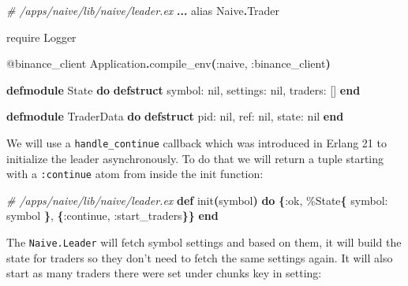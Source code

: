 \documentclass[
  oneside]{book}
\newenvironment{Shaded}{\begin{snugshade}}{\end{snugshade}}
\newcommand{\CommentTok}[1]{\textcolor[rgb]{0.56,0.35,0.01}{\textit{#1}}}
\newcommand{\ConstantTok}[1]{\textcolor[rgb]{0.56,0.35,0.01}{#1}}
\newcommand{\FunctionTok}[1]{\textcolor[rgb]{0.13,0.29,0.53}{\textbf{#1}}}
\newcommand{\ImportTok}[1]{#1}
\newcommand{\KeywordTok}[1]{\textcolor[rgb]{0.13,0.29,0.53}{\textbf{#1}}}
\newcommand{\NormalTok}[1]{#1}
\newcommand{\OperatorTok}[1]{\textcolor[rgb]{0.81,0.36,0.00}{\textbf{#1}}}
\newcommand{\OtherTok}[1]{\textcolor[rgb]{0.56,0.35,0.01}{#1}}
\newcommand{\VariableTok}[1]{\textcolor[rgb]{0.00,0.00,0.00}{#1}}
\begin{document}
\begin{Shaded}
\begin{Highlighting}[]
\CommentTok{\# /apps/naive/lib/naive/leader.ex}
  \OperatorTok{...}
  \ImportTok{alias} \ConstantTok{Naive}\OperatorTok{.}\ConstantTok{Trader}

  \ImportTok{require} \ConstantTok{Logger}

  \OtherTok{@binance\_client} \ConstantTok{Application}\OperatorTok{.}\NormalTok{compile\_env}\FunctionTok{(}\VariableTok{:naive}\NormalTok{, }\VariableTok{:binance\_client}\FunctionTok{)}

  \KeywordTok{defmodule} \ConstantTok{State} \KeywordTok{do}
    \KeywordTok{defstruct} \VariableTok{symbol:} \ConstantTok{nil}\NormalTok{,}
              \VariableTok{settings:} \ConstantTok{nil}\NormalTok{,}
              \VariableTok{traders:} \OtherTok{[]}
  \KeywordTok{end}

  \KeywordTok{defmodule} \ConstantTok{TraderData} \KeywordTok{do}
    \KeywordTok{defstruct} \VariableTok{pid:} \ConstantTok{nil}\NormalTok{,}
              \VariableTok{ref:} \ConstantTok{nil}\NormalTok{,}
              \VariableTok{state:} \ConstantTok{nil}
  \KeywordTok{end}
\end{Highlighting}
\end{Shaded}

We will use a \texttt{handle\_continue} callback which was introduced in Erlang 21 to
initialize the leader asynchronously. To do that we will return a tuple starting with a \texttt{:continue} atom from inside the init function:

\begin{Shaded}
\begin{Highlighting}[]
  \CommentTok{\# /apps/naive/lib/naive/leader.ex}
  \KeywordTok{def}\NormalTok{ init}\FunctionTok{(}\NormalTok{symbol}\FunctionTok{)} \KeywordTok{do}
    \FunctionTok{\{}\VariableTok{:ok}\NormalTok{,}
\NormalTok{      \%}\ConstantTok{State}\FunctionTok{\{}
          \VariableTok{symbol:}\NormalTok{ symbol}
      \FunctionTok{\}}\NormalTok{, }\FunctionTok{\{}\VariableTok{:continue}\NormalTok{, }\VariableTok{:start\_traders}\FunctionTok{\}\}}
  \KeywordTok{end}
\end{Highlighting}
\end{Shaded}

The \texttt{Naive.Leader} will fetch symbol settings and based on them, it will build the state for traders so they don't need to fetch the same settings again. It will also start as many traders there were set under chunks key in setting:
\end{document}
